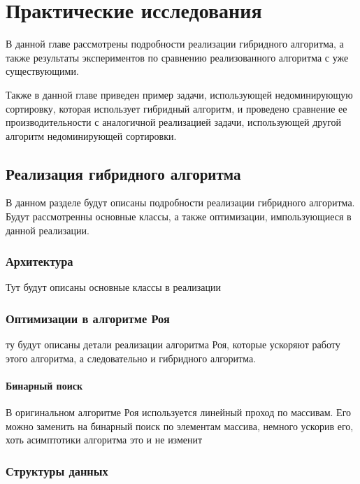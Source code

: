 \chapter{Практические исследования} 
\label{chapter3}

В данной главе рассмотрены подробности реализации гибридного алгоритма, а также результаты экспериментов по сравнению реализованного алгоритма с уже существующими.

Также в данной главе приведен пример задачи, использующей недоминирующую сортировку, которая использует гибридный алгоритм, и проведено сравнение ее производительности с аналогичной реализацией задачи, использующей другой алгоритм недоминирующей сортировки.

\section{Реализация гибридного алгоритма}

В данном разделе будут описаны подробности реализации гибридного алгоритма. Будут рассмотренны основные классы, а также оптимизации, импользующиеся в данной реализации.

\subsection{Архитектура}

Тут будут описаны основные классы в реализации

\subsection{Оптимизации в алгоритме Роя}

ту будут описаны детали реализации алгоритма Роя, которые ускоряют работу этого алгоритма, а следовательно и гибридного алгоритма.

\subsubsection{Бинарный поиск}

В оригинальном алгоритме Роя используется линейный проход по массивам. %
Его можно заменить на бинарный поиск по элементам массива, немного ускорив его, хоть асимптотики алгоритма это и не изменит

\subsection{Структуры данных}

